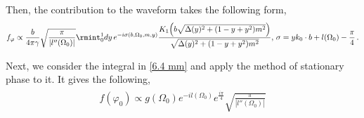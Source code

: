 Then, the contribution to the waveform takes the following form,
\begin{equation}\label{ch2:e:massive-waveform}\begin{split}
f_{\varphi}\propto \frac{b}{4\pi\gamma}\sqrt{\frac{\pi}{|l''(\Omega_0)|}}\rmint_0^1 dy\,e^{-i\sigma(b,\Omega_0,m,y)}\frac{K_1\Big( b\sqrt{\Delta(y)^2+(1-y+y^2)m^2}\Big)}{\sqrt{\Delta(y)^2+(1-y+y^2)m^2}},\,\sigma=y k_0\cdot b+l(\Omega_0)-\frac{\pi}{4}\,.
\\
        \end{split}
\end{equation}

Next, we consider the integral in \eqref{6.4 mm} and apply  the method of stationary phase to it. It gives the following,
\begin{align}
    \begin{split}
        f(\varphi_0)\propto g(\Omega_0)e^{-il(\Omega_0)}e^{\frac{i\pi}{4}}\sqrt{\frac{\pi}{|l''(\Omega_0)|}}
    \end{split}
\end{align}
